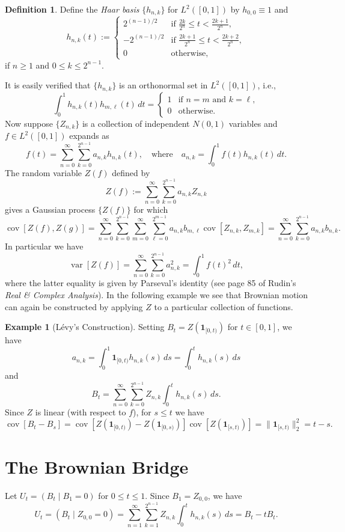\documentclass{article}
\DeclareMathOperator{\var}{var}
\DeclareMathOperator{\cov}{cov}
\theoremstyle{definition}
\newtheorem{defn}[thm]{Definition}
\newtheorem{exmp}[thm]{Example}
\begin{document}
\begin{defn}
Define the \emph{Haar basis} $\{h_{n,k}\}$ for $L^2([0,1])$ by $h_{0,0}\equiv 1$ and $$h_{n,k}(t):=\begin{cases}2^{(n-1)/2}&\text{if }\frac{2k}{2^n}\leq t<\frac{2k+1}{2^n},\\-2^{(n-1)/2}&\text{if }\frac{2k+1}{2^n}\leq t<\frac{2k+2}{2^n},\\0&\text{otherwise,}\end{cases}$$ if $n\geq 1$ and $0\leq k\leq 2^{n-1}$.
\end{defn}

It is easily verified that $\{h_{n,k}\}$ is an orthonormal set in $L^2([0,1])$, i.e., $$\int_0^1h_{n,k}(t)h_{m,\ell}(t)\,dt=\begin{cases}1&\text{if $n=m$ and $k=\ell$},\\0&\text{otherwise}.\end{cases}$$ Now suppose $\{Z_{n,k}\}$ is a collection of independent $N(0,1)$ variables and $f\in L^2([0,1])$ expands as $$f(t)=\sum_{n=0}^\infty\sum_{k=0}^{2^{n-1}}a_{n,k}h_{n,k}(t),\quad\text{where}\quad a_{n,k}=\int_0^1f(t)h_{n,k}(t)\,dt.$$ The random variable $Z(f)$ defined by $$Z(f):=\sum_{n=0}^\infty\sum_{k=0}^{2^{n-1}}a_{n,k}Z_{n,k}$$ gives a Gaussian process $\{Z(f)\}$ for which $$\cov[Z(f),Z(g)]=\sum_{n=0}^\infty\sum_{k=0}^{2^{n-1}}\sum_{m=0}^\infty\sum_{\ell=0}^{2^{m-1}}a_{n,k}b_{m,\ell}\cov[Z_{n,k},Z_{m,k}]=\sum_{n=0}^\infty\sum_{k=0}^{2^{n-1}}a_{n,k}b_{n,k}.$$ In particular we have $$\var[Z(f)]=\sum_{n=0}^\infty\sum_{k=0}^{2^{n-1}}a_{n,k}^2=\int_0^1f(t)^2\,dt,$$ where the latter equality is given by Parseval's identity (see page 85 of Rudin's \emph{Real \& Complex Analysis}). In the following example we see that Brownian motion can again be constructed by applying $Z$ to a particular collection of functions.
 
\begin{exmp}[L\'evy's Construction]
Setting $B_t=Z(\mathbf{1}_{[0,t)})$ for $t\in[0,1]$, we have $$a_{n,k}=\int_0^1\mathbf{1}_{[0,t)}h_{n,k}(s)\,ds=\int_0^th_{n,k}(s)\,ds$$ and $$B_t=\sum_{n=0}^\infty\sum_{k=0}^{2^{n-1}}Z_{n,k}\int_0^th_{n,k}(s)\,ds.$$ Since $Z$ is linear (with respect to $f$), for $s\leq t$ we have $$\cov[B_t-B_s]=\cov[Z(\mathbf{1}_{[0,t)})-Z(\mathbf{1}_{[0,s)})]\cov[Z(\mathbf{1}_{[s,t)})]=\|\mathbf{1}_{[s,t)}\|_2^2=t-s.$$
\end{exmp}

\section{The Brownian Bridge}
Let $U_t=(B_t\mid B_1=0)$ for $0\leq t\leq 1$. Since $B_1=Z_{0,0}$, we have $$U_t=(B_t\mid Z_{0,0}=0)=\sum_{n=1}^\infty\sum_{k=1}^{2^{n-1}}Z_{n,k}\int_0^th_{n,k}(s)\,ds=B_t-tB_t.$$
\end{document}
